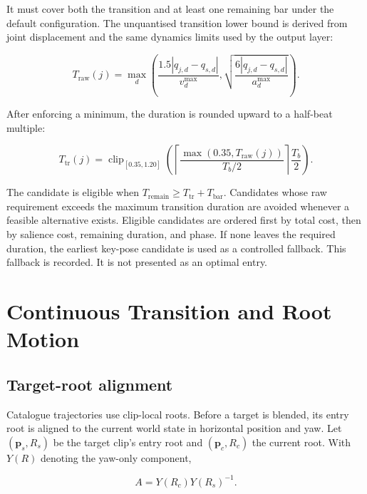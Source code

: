 It must cover both the transition and at least one remaining bar under the
default configuration. The unquantised transition lower bound is derived from
joint displacement and the same dynamics limits used by the output layer:

\begin{equation}
    T_{\mathrm{raw}}(j)=\max_d\left(
       \frac{1.5|q_{j,d}-q_{s,d}|}{v_d^{\max}},
       \sqrt{\frac{6|q_{j,d}-q_{s,d}|}{a_d^{\max}}}
    \right).
    \label{eq:ch5_transition_lower_bound}
\end{equation}

After enforcing a minimum, the duration is rounded upward to a half-beat
multiple:

\begin{equation}
    T_{\mathrm{tr}}(j)=
    \operatorname{clip}_{[0.35,1.20]}
    \left(
      \left\lceil\frac{\max(0.35,T_{\mathrm{raw}}(j))}{T_b/2}\right\rceil
      \frac{T_b}{2}
    \right).
    \label{eq:ch5_transition_quantisation}
\end{equation}

The candidate is eligible when
$T_{\mathrm{remain}}\geq T_{\mathrm{tr}}+T_{\mathrm{bar}}$. Candidates whose
raw requirement exceeds the maximum transition duration are avoided whenever
a feasible alternative exists. Eligible candidates are ordered first by total
cost, then by salience cost, remaining duration, and phase. If none leaves the
required duration, the earliest key-pose candidate is used as a controlled
fallback. This fallback is recorded. It is not presented as an optimal entry.

\section{Continuous Transition and Root Motion}
\label{sec:ch5_continuous_transition}

\subsection{Target-root alignment}
\label{subsec:ch5_root_alignment}

Catalogue trajectories use clip-local roots. Before a target is blended, its
entry root is aligned to the current world state in horizontal position and
yaw. Let $(\mathbf{p}_s,R_s)$ be the target clip's entry root and
$(\mathbf{p}_c,R_c)$ the current root. With $Y(R)$ denoting the yaw-only
component,

\begin{equation}
    A=Y(R_c)Y(R_s)^{-1}.
    \label{eq:ch5_yaw_alignment}
\end{equation}

